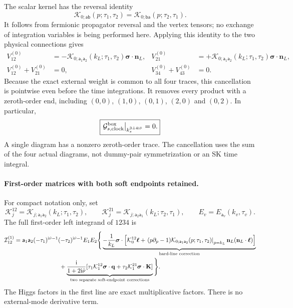 \documentclass[a4paper,12pt]{article}
\newcommand{\ii}{\mathrm i}
\newcommand{\mb}{\mathbf}
\newcommand{\tn}{\tilde\nu}
\def\aa{\mathsf a}
\newcommand{\bb}{\mathsf b}
\newcommand{\bq}{\mb q}
\newcommand{\bs}{\bm\sigma}
\newcommand{\G}{\mathcal G}
\begin{document}
The scalar kernel has the reversal identity
\begin{equation}
 \mathcal K_{0;\aa\bb}(p;\tau_1,\tau_2)
 =\mathcal K_{0;\bb\aa}(p;\tau_2,\tau_1).
 \label{eq:reverse}
\end{equation}
It follows from fermionic propagator reversal and the vertex tensors;
no exchange of integration variables is being performed here.
Applying this identity to the two physical connections gives
\begin{align}
 V_{12}^{(0)}
 &=-\mathcal K_{0;\aa_1\aa_2}(k_L;\tau_1,\tau_2)\bs\cdot\mb n_L,
 &V_{21}^{(0)}
 &=+\mathcal K_{0;\aa_1\aa_2}(k_L;\tau_1,\tau_2)\bs\cdot\mb n_L,\nonumber\\
 V_{12}^{(0)}+V_{21}^{(0)}&=0,
 &V_{34}^{(0)}+V_{43}^{(0)}&=0.
 \label{eq:integrand-zero}
\end{align}
Because the exact external weight is common to all four traces,
this cancellation is pointwise even before the time integrations.
It removes every product with a zeroth-order end, including
$(0,0)$, $(1,0)$, $(0,1)$, $(2,0)$ and $(0,2)$. In particular,
\begin{equation}
 \boxed{\left.\G^{\rm box}_{s,\rm clock}\right|_{k_s^{3\pm4\ii\tn}}=0.}
 \label{eq:cancellation}
\end{equation}
A single diagram has a nonzero zeroth-order trace. The cancellation
uses the sum of the four actual diagrams, not dummy-pair
symmetrization or an SK time integral.

\paragraph{First-order matrices with both soft endpoints retained.}
For compact notation only, set
\begin{equation}
 \mathcal K_j^{12}=\mathcal K_{j;\aa_1\aa_2}(k_L;\tau_1,\tau_2),
 \qquad
 \mathcal K_j^{21}=\mathcal K_{j;\aa_2\aa_1}(k_L;\tau_2,\tau_1),
 \qquad E_v=E_{\aa_v}(k_v,\tau_v).
 \label{eq:direct-kernel-shorthand}
\end{equation}
The full first-order left integrand of $1234$ is
\begin{align}
 \mathcal I_{12}^{(1)}
 ={}&\aa_1\aa_2(-\tau_1)^{\ii\tn-1}(-\tau_2)^{\ii\tn-1}E_1E_2
 \Bigg\{
 \underbrace{-\frac1{k_L}\bs\cdot
 \left[\mathcal K_0^{12}\bm\ell+
 \left.(p\partial_p-1)\mathcal K_{0;\aa_1\aa_2}(p;\tau_1,\tau_2)\right|_{p=k_L}
 \mb n_L(\mb n_L\cdot\bm\ell)\right]}_{\text{hard-line correction}}
 \nonumber\\
 &\hspace{22mm}
 +\underbrace{\frac{\ii}{1+2\ii\tn}
 [\tau_1\mathcal K_1^{12}\bs\cdot\bq+
  \tau_2\mathcal K_1^{21}\bs\cdot\mb K]}_
 {\text{two separate soft-endpoint corrections}}
 \Bigg\}.
 \label{eq:direct-first-order-integrand}
\end{align}
The Higgs factors in the first line are exact multiplicative factors.
There is no external-mode derivative term.
\end{document}
